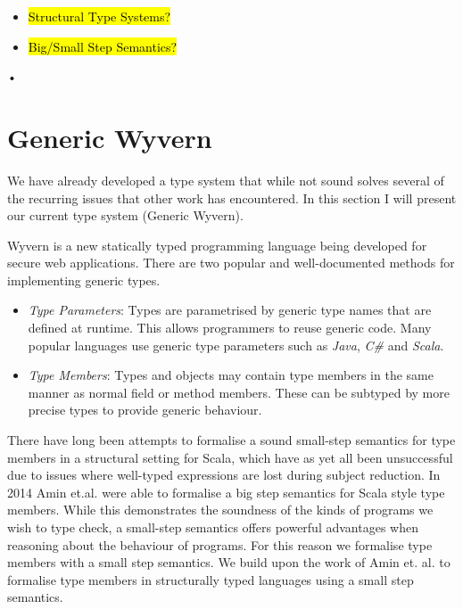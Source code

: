 \documentclass[11pt
              , a4paper
              , twoside
              , openright
              ]{report}
\begin{document}
\begin{itemize}
\item
\hl{Structural Type Systems?}
\item
\hl{Big/Small Step Semantics?}
\end{itemize}•



\chapter{Generic Wyvern}\label{ch:wyvern}

We have already developed a type system that while not sound solves several of the recurring issues that other work has encountered. In this section I will present our current type system (Generic Wyvern).

Wyvern is a new statically typed programming language being developed for secure web applications. There are two popular and well-documented methods \cite{Virtual Types stuff, generic java etc} for implementing generic types.
\begin{itemize}
\item \emph{Type Parameters}: Types are parametrised by generic type names that are defined at runtime. This allows programmers to reuse generic code. Many popular languages use generic type parameters such as \emph{Java}, \emph{C\#} and \emph{Scala}.
\item \emph{Type Members}: Types and objects may contain type members in the same manner as normal field or method members. These can be subtyped by more precise types to provide generic behaviour.
\end{itemize}
There have long been attempts to formalise a sound small-step semantics for type members in a structural setting for Scala, which have as yet all been unsuccessful due to issues where well-typed expressions are lost during subject reduction. In 2014 Amin et.al. were able to formalise a big step semantics for Scala style type members. While this demonstrates the soundness of the kinds of programs we wish to type check, a small-step semantics offers powerful advantages when reasoning about the behaviour of programs. For this reason we formalise type members with a small step semantics.
We build upon the work of Amin et. al. \cite{Scala stuff} to formalise type members in structurally typed languages using a small step semantics. 
\end{document}
